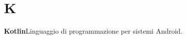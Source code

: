 \newpage
\section{K}\label{l:K}
\textbf{Kotlin}\newline Linguaggio di programmazione per sistemi Android.